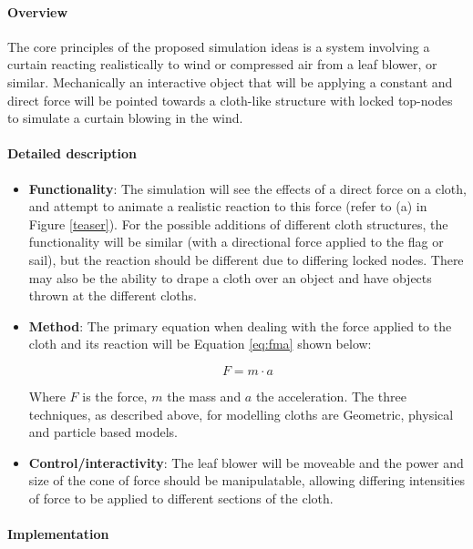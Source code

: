 \documentclass[conference,backref=page]{acmsiggraph}
\begin{document}
\paragraph{Overview}
The core principles of the proposed simulation ideas is a system involving a curtain reacting realistically to wind or compressed air from a leaf blower, or similar. Mechanically an interactive object that will be applying a constant and direct force will be pointed towards a cloth-like structure with locked top-nodes to simulate a curtain blowing in the wind.

\paragraph{Detailed description}
\begin{itemize}
\item {\bf Functionality}: The simulation will see the effects of a direct force on a cloth, and attempt to animate a realistic reaction to this force (refer to (a) in Figure \ref{teaser}). For the possible additions of different cloth structures, the functionality will be similar (with a directional force applied to the flag or sail), but the reaction should be different due to differing locked nodes. There may also be the ability to drape a cloth over an object and have objects thrown at the different cloths.
\item {\bf Method}: The primary equation when dealing with the force applied to the cloth and its reaction will be Equation \ref{eq:fma} shown below:

\begin{equation} \label{eq:fma}
F = m\cdot a
\end{equation}

Where $F$ is the force, $m$ the mass and $a$ the acceleration. The three techniques, as described above, for modelling cloths are Geometric, physical and particle based models.

\item {\bf Control/interactivity}: The leaf blower will be moveable and the power and size of the cone of force should be manipulatable, allowing differing intensities of force to be applied to different sections of the cloth.
\end{itemize}

\paragraph{Implementation}
\end{document}
